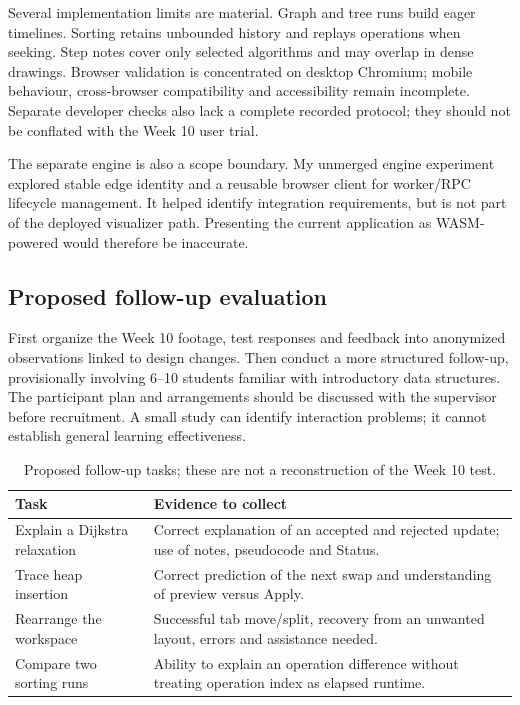 \documentclass[11pt,a4paper]{article}
\begin{document}
Several implementation limits are material. Graph and tree runs build eager timelines. Sorting retains unbounded history and replays operations when seeking. Step notes cover only selected algorithms and may overlap in dense drawings. Browser validation is concentrated on desktop Chromium; mobile behaviour, cross-browser compatibility and accessibility remain incomplete. Separate developer checks also lack a complete recorded protocol; they should not be conflated with the Week 10 user trial.

The separate engine is also a scope boundary. My unmerged engine experiment explored stable edge identity and a reusable browser client for worker/RPC lifecycle management. It helped identify integration requirements, but is not part of the deployed visualizer path. Presenting the current application as WASM-powered would therefore be inaccurate.

\subsection{Proposed follow-up evaluation}
First organize the Week 10 footage, test responses and feedback into anonymized observations linked to design changes. Then conduct a more structured follow-up, provisionally involving 6--10 students familiar with introductory data structures. The participant plan and arrangements should be discussed with the supervisor before recruitment. A small study can identify interaction problems; it cannot establish general learning effectiveness.

\begin{table}[tbp]\small\centering
\caption{Proposed follow-up tasks; these are not a reconstruction of the Week 10 test.}
\begin{tabularx}{\linewidth}{@{}p{41mm}X@{}}\toprule
Task & Evidence to collect\\\midrule
Explain a Dijkstra relaxation & Correct explanation of an accepted and rejected update; use of notes, pseudocode and Status.\\
Trace heap insertion & Correct prediction of the next swap and understanding of preview versus Apply.\\
Rearrange the workspace & Successful tab move/split, recovery from an unwanted layout, errors and assistance needed.\\
Compare two sorting runs & Ability to explain an operation difference without treating operation index as elapsed runtime.\\\bottomrule
\end{tabularx}
\end{table}
\end{document}
